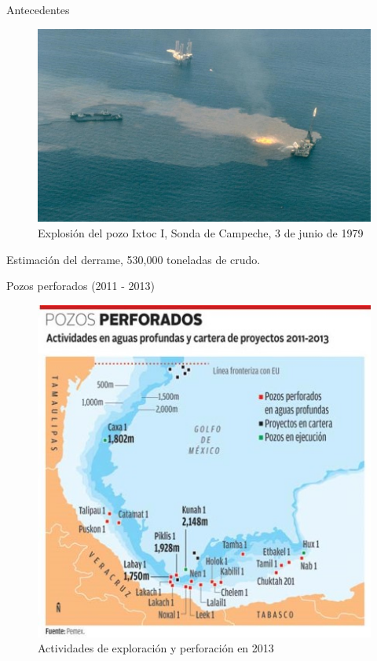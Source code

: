 \begin{frame}{Antecedentes}    
    \begin{figure}
        \centering
        \includegraphics[scale=0.3]{img/section_01/explosion_ixtoc.jpg}
        \caption{Explosión del pozo Ixtoc I, Sonda de Campeche, 3 de junio de 1979}
        \label{fig:section_01_explosion_ixtoc}
    \end{figure}

    Estimación del derrame, 530,000 toneladas de crudo.
\end{frame}

\begin{frame}{Pozos perforados (2011 - 2013)}
    \begin{figure}
        \centering
        \includegraphics[scale=0.4]{img/section_01/pozos_perforados_2013.jpg}
        \caption{Actividades de exploración y perforación en 2013}
        \label{fig:section_01_pozos}
    \end{figure}
\end{frame}

